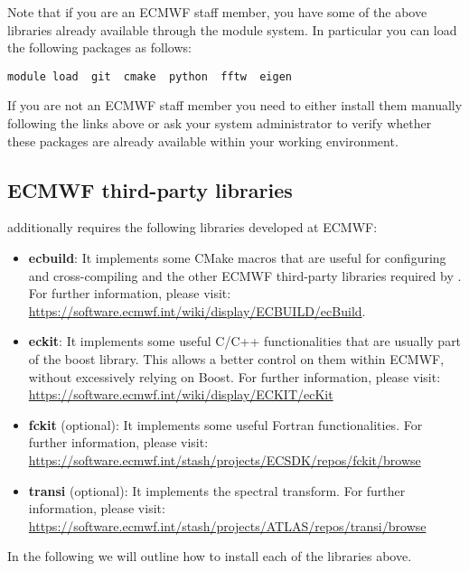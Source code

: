 %
Note that if you are an ECMWF staff member, you have some of the above 
libraries already available through the module system. In particular 
you can load the following packages as follows:
%
\begin{lstlisting}[style=BashStyle]
module load  git  cmake  python  fftw  eigen
\end{lstlisting}
%
If you are not an ECMWF staff member you need to either install them 
manually following the links above or ask your system administrator 
to verify whether these packages are already available within your 
working environment.


\subsection{ECMWF third-party libraries}
\label{s:ecmwf-libs}
\Atlas additionally requires the following libraries developed 
at ECMWF:
%
\begin{itemize}
\item \textbf{ecbuild}: It implements some CMake macros that 
are useful for configuring and cross-compiling \Atlas and the 
other ECMWF third-party libraries required by \Atlas. 
For further information, please visit: 
\url{https://software.ecmwf.int/wiki/display/ECBUILD/ecBuild}.
\item \textbf{eckit}: It implements some useful C/C++ 
functionalities that are usually part of the boost library. 
This allows a better control on them within ECMWF, without 
excessively relying on Boost. For further information, please 
visit: \url{https://software.ecmwf.int/wiki/display/ECKIT/ecKit}
\item \textbf{fckit} (optional): It implements some useful 
Fortran functionalities. For further information, please 
visit: \url{https://software.ecmwf.int/stash/projects/ECSDK/repos/fckit/browse}
\item \textbf{transi} (optional): It implements the spectral 
transform. For further information, please visit:
\url{https://software.ecmwf.int/stash/projects/ATLAS/repos/transi/browse}
\end{itemize}
%
In the following we will outline how to install each of the 
libraries above. 

